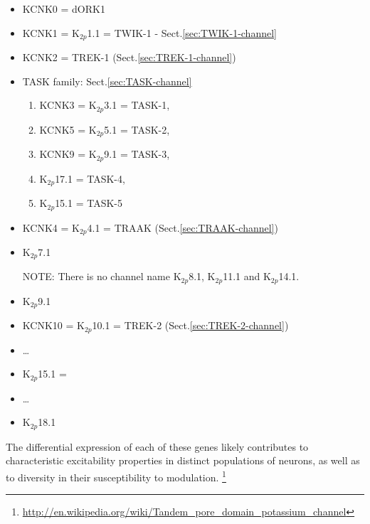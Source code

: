\begin{itemize}
  \item KCNK0 = dORK1
  
  \item KCNK1 = K$_{2p}$1.1 = TWIK-1 - Sect.\ref{sec:TWIK-1-channel} 
  
  
  \item KCNK2 = TREK-1 (Sect.\ref{sec:TREK-1-channel})
  
  \item TASK family: Sect.\ref{sec:TASK-channel}
  \begin{enumerate}
    \item KCNK3 =   K$_{2p}$3.1 = TASK-1, 

    \item KCNK5 = K$_{2p}$5.1 = TASK-2, 
    
    \item KCNK9 = K$_{2p}$9.1 = TASK-3, 

    
    \item K$_{2p}$17.1 = TASK-4,
     
    \item K$_{2p}$15.1 = TASK-5
  \end{enumerate}
   
  \item KCNK4 = K$_{2p}$4.1 = TRAAK (Sect.\ref{sec:TRAAK-channel})
  
  
  
  \item K$_{2p}$7.1
  
  NOTE: There is no channel name K$_{2p}$8.1, K$_{2p}$11.1 and K$_{2p}$14.1.
  
  \item K$_{2p}$9.1 
  
  \item KCNK10 = K$_{2p}$10.1 = TREK-2  (Sect.\ref{sec:TREK-2-channel})
  
  
  \item \ldots
  \item K$_{2p}$15.1 =
  \item \ldots 
  \item K$_{2p}$18.1 
\end{itemize}
 
The differential expression of each of these genes likely contributes to
characteristic  excitability  properties  in  distinct  populations  of
neurons,  as  well  as  to  diversity  in  their  susceptibility  to
modulation.
\footnote{\url{http://en.wikipedia.org/wiki/Tandem_pore_domain_potassium_channel}}


